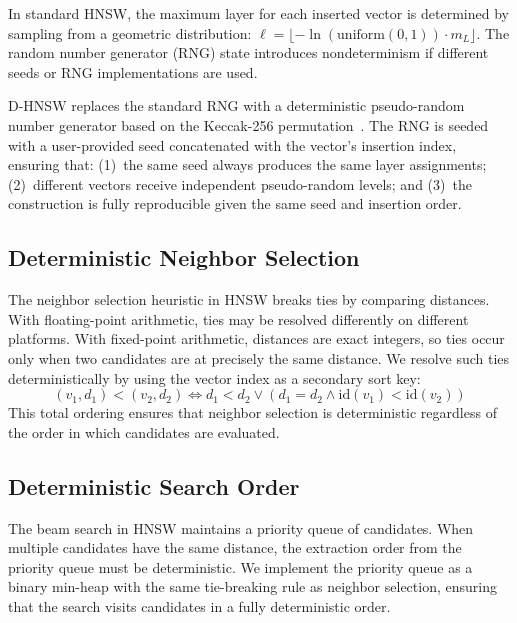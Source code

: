 \documentclass[10pt,journal,compsoc]{IEEEtran}
\newcommand{\dhnsw}{\textsc{D-HNSW}}
\newcommand{\hnsw}{\textsc{HNSW}}
\begin{document}
In standard \hnsw{}, the maximum layer for each inserted vector is determined by sampling from a geometric distribution: $\ell = \lfloor -\ln(\text{uniform}(0,1)) \cdot m_L \rfloor$. The random number generator (RNG) state introduces nondeterminism if different seeds or RNG implementations are used.

\dhnsw{} replaces the standard RNG with a deterministic pseudo-random number generator based on the Keccak-256 permutation~\cite{bertoni2013keccak}. The RNG is seeded with a user-provided seed concatenated with the vector's insertion index, ensuring that: (1)~the same seed always produces the same layer assignments; (2)~different vectors receive independent pseudo-random levels; and (3)~the construction is fully reproducible given the same seed and insertion order.

\subsection{Deterministic Neighbor Selection}

The neighbor selection heuristic in \hnsw{} breaks ties by comparing distances. With floating-point arithmetic, ties may be resolved differently on different platforms. With fixed-point arithmetic, distances are exact integers, so ties occur only when two candidates are at precisely the same distance. We resolve such ties deterministically by using the vector index as a secondary sort key:
\begin{equation}
  (v_1, d_1) < (v_2, d_2) \iff d_1 < d_2 \lor (d_1 = d_2 \land \text{id}(v_1) < \text{id}(v_2))
\end{equation}
This total ordering ensures that neighbor selection is deterministic regardless of the order in which candidates are evaluated.

\subsection{Deterministic Search Order}

The beam search in \hnsw{} maintains a priority queue of candidates. When multiple candidates have the same distance, the extraction order from the priority queue must be deterministic. We implement the priority queue as a binary min-heap with the same tie-breaking rule as neighbor selection, ensuring that the search visits candidates in a fully deterministic order.


\end{document}
